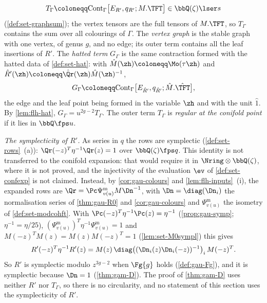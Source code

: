 \begin{defn}
\[
T_\Gamma\coloneqq\mathrm{Cont}_\Gamma\bigl[E_{R'},q_{R'};M.\TFT\bigr]\in\bbQ(\zeta)\lser s
\]
(\cref{def:set-graphsum}); the vertex tensors are the full tensors of $M.\TFT$, so $T_\Gamma$ contains the sum over all colourings of $\Gamma$. The \emph{vertex graph} is the stable graph with one vertex, of genus $g$, and no edge; its outer term contains all the leaf insertions of $R'$. The \emph{hatted term} $G_\Gamma$ is the same contraction formed with the hatted data of \cref{def:set-hat}: with $\hat M(\zh)\coloneqq\Mo(\tau\zh)$ and $\hat R'(\zh)\coloneqq\hat\Qr(\zh)\hat M(\zh)^{-1}$,
\[
G_\Gamma\coloneqq\mathrm{Cont}_\Gamma\bigl[E_{\hat R'},q_{\hat R'};\hat M.\hat\TFT\bigr],
\]
the edge and the leaf point being formed in the variable $\zh$ and with the unit $\hat1$. By \cref{lem:flh-hat}, $G_\Gamma=u^{2g-2}T_\Gamma$. The outer term $T_\Gamma$ is \emph{regular at the conifold point} if it lies in $\bbQ\fps u$.

\emph{The symplecticity of $R'$.} As series in $q$ the rows are symplectic (\cref{def:set-rows}~(a)): $\Qr(-z)^T\eta^{-1}\Qr(z)=1$ over $\bbQ(\zeta)\fps q$. This identity is not transferred to the conifold expansion: that would require it in $\Nring\otimes\bbQ(\zeta)$, where it is not proved, and the injectivity of the evaluation $\ev$ of \cref{def:set-confexp} is not claimed. Instead, by \cref{cor:gau-colours} and \cref{lem:flh-inputs}~(i), the expanded rows are $\Qr=\Pc\Psi^{\mathrm m}_{v(u)}M\Dn^{-1}$, with $\Dn=\diag(\Dn_i)$ the normalisation series of \cref{thm:gau-R0} and \cref{cor:gau-colours} and $\Psi^{\mathrm m}_{v(u)}$ the isometry of \cref{def:set-modcohft}. With $\Pc(-z)^T\eta^{-1}\Pc(z)=\eta^{-1}$ (\cref{prop:gau-symp}; $\eta^{-1}=\eta/25$), $(\Psi^{\mathrm m}_{v(u)})^T\eta^{-1}\Psi^{\mathrm m}_{v(u)}=1$ and $M(-z)^TM(z)=M(z)M(-z)^T=1$ (\cref{lem:set-M0sympl}) this gives
\[
R'(-z)^T\eta^{-1}R'(z)=M(z)\,\diag\bigl((\Dn_i(z)\Dn_i(-z))^{-1}\bigr)_i\,M(-z)^T .
\]
So $R'$ is symplectic modulo $z^{3g-2}$ when $\Fg{g}$ holds (\cref{def:gau-Fg}), and it is symplectic because $\Dn=1$ (\cref{thm:gam-D}). The proof of \cref{thm:gam-D} uses neither $R'$ nor $T_\Gamma$, so there is no circularity, and no statement of this section uses the symplecticity of $R'$.
\end{defn}

